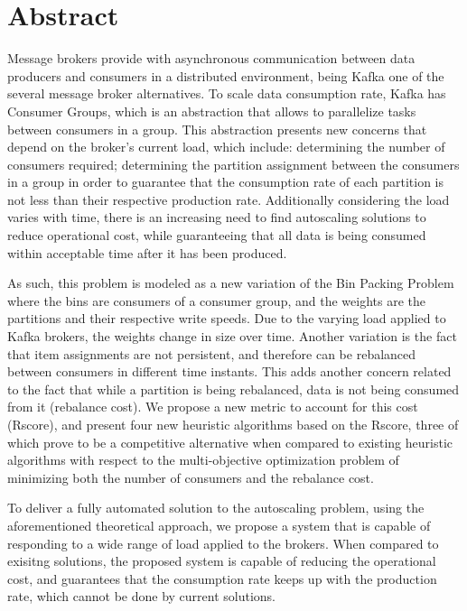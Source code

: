 \chapter*{Abstract}

Message brokers provide with asynchronous communication between data producers
and consumers in a distributed environment, being Kafka one of the several
message broker alternatives. To scale data consumption rate, Kafka has Consumer
Groups, which is an abstraction that allows to parallelize tasks between
consumers in a group. This abstraction presents new concerns that depend on the
broker's current load, which include: determining the number of consumers
required; determining the partition assignment between the consumers in a group
in order to guarantee that the consumption rate of each partition is not less
than their respective production rate. Additionally considering the load varies
with time, there is an increasing need to find autoscaling solutions to reduce
operational cost, while guaranteeing that all data is being consumed within
acceptable time after it has been produced.

As such, this problem is modeled as a new variation of the Bin Packing Problem
where the bins are consumers of a consumer group, and the weights are the
partitions and their respective write speeds. Due to the varying load applied to
Kafka brokers, the weights change in size over time. Another variation is the
fact that item assignments are not persistent, and therefore can be rebalanced
between consumers in different time instants. This adds another concern related
to the fact that while a partition is being rebalanced, data is not being
consumed from it (rebalance cost). We propose a new metric to account for this
cost (Rscore), and present four new heuristic algorithms based on the Rscore,
three of which prove to be a competitive alternative when compared to existing
heuristic algorithms with respect to the multi-objective optimization problem of
minimizing both the number of consumers and the rebalance cost.

To deliver a fully automated solution to the autoscaling problem, using the
aforementioned theoretical approach, we propose a system that is capable of
responding to a wide range of load applied to the brokers. When compared to
exisitng solutions, the proposed system is capable of reducing the operational
cost, and guarantees that the consumption rate keeps up with the production
rate, which cannot be done by current solutions. 

